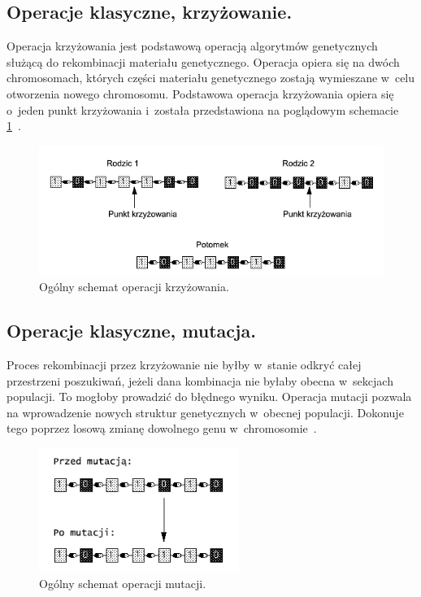 \documentclass[twoside,12pt]{report}
\begin{document}
\subsection{Operacje klasyczne, krzyżowanie.}

Operacja krzyżowania jest podstawową operacją algorytmów genetycznych służącą do rekombinacji materiału genetycznego. Operacja opiera się na dwóch chromosomach, których części materiału genetycznego zostają wymieszane w~celu otworzenia nowego chromosomu. Podstawowa operacja krzyżowania opiera się o~jeden punkt krzyżowania i~została przedstawiona na poglądowym schemacie \ref{krzyzowanie}~\cite{gene mutikrzyz}.

\begin{figure}[ht]
\begin{center}
\includegraphics[width=\textwidth]{img/crossover}
\caption{Ogólny schemat operacji krzyżowania.}
\label{krzyzowanie}
\end{center}
\end{figure}

\subsection{Operacje klasyczne, mutacja.}

Proces rekombinacji przez krzyżowanie nie byłby w~stanie odkryć całej przestrzeni poszukiwań, jeżeli dana kombinacja nie byłaby obecna w~sekcjach populacji. To mogłoby prowadzić do błędnego wyniku. Operacja mutacji pozwala na wprowadzenie nowych struktur genetycznych w~obecnej populacji. Dokonuje tego poprzez losową zmianę dowolnego genu w~chromosomie~\cite{gene mutikrzyz}.

\begin{figure}[ht]
\begin{center}
\includegraphics[width=0.580\textwidth]{img/mutation}
\caption{Ogólny schemat operacji mutacji.}
\end{center}
\end{figure}
\end{document}
